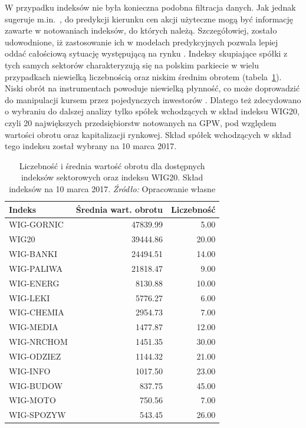 \documentclass[12pt,a4paper,twoside,openany]{book}
\begin{document}
W przypadku indeksów nie była konieczna podobna filtracja danych. Jak jednak sugeruje m.in.~\citet{madge2015}, do predykcji kierunku cen akcji użyteczne mogą być informację zawarte w notowaniach indeksów, do których należą. Szczegółowiej, zostało udowodnione, iż zastosowanie ich w modelach predykcyjnych pozwala lepiej oddać całościową sytuację występującą na rynku \citep{swensen2015,citak2007}. Indeksy skupiające spółki z tych samych sektorów charakteryzują się na polskim parkiecie w wielu przypadkach niewielką liczebnością oraz niskim średnim obrotem (tabela~\ref{tab003}). Niski obrót na instrumentach powoduje niewielką płynność, co może doprowadzić do manipulacji kursem przez pojedynczych inwestorów \citep{allen1992}. Dlatego też zdecydowano o wybraniu do dalszej analizy tylko spółek wchodzących w skład indeksu WIG20, czyli 20 największych przedsiębiorstw notowanych na GPW, pod względem wartości obrotu oraz kapitalizacji rynkowej. Skład spółek wchodzących w skład tego indeksu został wybrany na 10 marca 2017. 

\begin{table}[ht] 
\caption{Liczebność i średnia wartość obrotu dla dostępnych indeksów sektorowych oraz indeksu WIG20. Skład indeksów na 10 marca 2017. \textit{Źródło:} Opracowanie własne}\label{tab003}
\centering
\begin{tabular}{lrr}
  \hline
Indeks & Średnia wart. obrotu & Liczebność \\ 
  \hline
WIG-GORNIC & 47839.99 & 5.00 \\ 
  WIG20 & 39444.86 & 20.00 \\ 
  WIG-BANKI & 24494.51 & 14.00 \\ 
  WIG-PALIWA & 21818.47 & 9.00 \\ 
  WIG-ENERG & 8130.88 & 10.00 \\ 
  WIG-LEKI & 5776.27 & 6.00 \\ 
  WIG-CHEMIA & 2954.73 & 7.00 \\ 
  WIG-MEDIA & 1477.87 & 12.00 \\ 
  WIG-NRCHOM & 1451.35 & 30.00 \\ 
  WIG-ODZIEZ & 1144.32 & 21.00 \\ 
  WIG-INFO & 1017.50 & 23.00 \\ 
  WIG-BUDOW & 837.75 & 45.00 \\ 
  WIG-MOTO & 750.56 & 7.00 \\ 
  WIG-SPOZYW & 543.45 & 26.00 \\ 
   \hline
\end{tabular}
\end{table}
\end{document}
